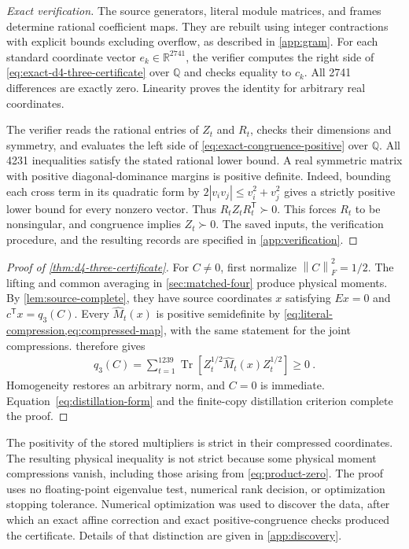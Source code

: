 \documentclass[aps,pra,reprint,superscriptaddress,amsmath,amssymb,floatfix,nofootinbib]{revtex4-2}
\newcommand{\Tr}{\operatorname{Tr}}
\newcommand{\norm}[1]{\left\lVert#1\right\rVert}
\newcommand{\R}{\mathbb R}
\newcommand{\Q}{\mathbb Q}
\begin{document}
\begin{proof}[Exact verification]
The source generators, literal module matrices, and frames determine
rational coefficient maps. They are rebuilt using integer contractions
with explicit bounds excluding overflow, as described in \cref{app:gram}.
For each standard coordinate vector $e_k\in\R^{2741}$, the verifier
computes the right side of \cref{eq:exact-d4-three-certificate} over
$\Q$ and checks equality to $c_k$. All 2741 differences are exactly zero.
Linearity proves the identity for arbitrary real coordinates.

The verifier reads the rational entries of $Z_t$ and $R_t$, checks their
dimensions and symmetry, and evaluates the left side of
\cref{eq:exact-congruence-positive} over $\Q$.
All 4231 inequalities satisfy the stated rational lower bound.
A real symmetric matrix with positive diagonal-dominance margins is
positive definite. Indeed, bounding each cross term in its quadratic
form by $2|v_i v_j|\leq v_i^2+v_j^2$ gives a strictly positive lower bound
for every nonzero vector.
Thus $R_tZ_tR_t^{\mathsf T}\succ0$.
This forces $R_t$ to be nonsingular, and congruence implies $Z_t\succ0$.
The saved inputs, the verification procedure, and the resulting records
are specified in \cref{app:verification}.
\end{proof}

\begin{proof}[Proof of \cref{thm:d4-three-certificate}]
For $C\ne0$, first normalize $\norm C_F^2=1/2$.
The lifting and common averaging in \cref{sec:matched-four} produce
physical moments. By \cref{lem:source-complete}, they have source
coordinates $x$ satisfying $Ex=0$ and $c^{\mathsf T}x=q_3(C)$.
Every $\widehat M_t(x)$ is positive semidefinite by
\cref{eq:literal-compression,eq:compressed-map}, with the same statement
for the joint compressions.
 therefore gives
\begin{align}
 q_3(C)=\sum_{t=1}^{1239}
 \Tr\!\left[Z_t^{1/2}\widehat M_t(x)Z_t^{1/2}\right]\geq0\ .
\end{align}
Homogeneity restores an arbitrary norm, and $C=0$ is immediate.
Equation~\eqref{eq:distillation-form} and the finite-copy distillation
criterion complete the proof.
\end{proof}

The positivity of the stored multipliers is strict in their compressed
coordinates. The resulting physical inequality is not strict because
some physical moment compressions vanish, including those arising from
\cref{eq:product-zero}.
The proof uses no floating-point eigenvalue test, numerical rank decision,
or optimization stopping tolerance.
Numerical optimization was used to discover the data, after which an
exact affine correction and exact positive-congruence checks produced
the certificate. Details of that distinction are given in
\cref{app:discovery}.
\end{document}
